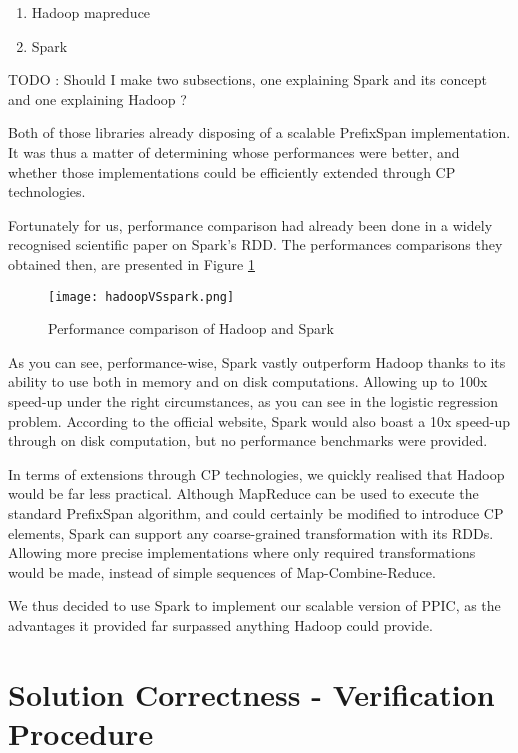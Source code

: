 \documentclass{eplmastersthesis}
\begin{document}
\begin{enumerate}
\item Hadoop mapreduce
\item Spark
\end{enumerate}

TODO : Should I make two subsections, one explaining Spark and its concept and one explaining Hadoop ?

Both of those libraries already disposing of a scalable PrefixSpan implementation. It was thus a matter of determining whose performances were better, and whether those implementations could be efficiently extended through CP technologies. \newline

Fortunately for us, performance comparison had already been done in a widely recognised scientific paper on Spark's RDD\cite{RDD}. The performances comparisons they obtained then, are presented in Figure \ref{fig:hadoopVSspark}

\begin{figure}[h]
  \centering
  \texttt{[image: hadoopVSspark.png]}
  \caption{Performance comparison of Hadoop and Spark}
  \label{fig:hadoopVSspark}
\end{figure}

As you can see, performance-wise, Spark vastly outperform Hadoop thanks to its ability to use both in memory and on disk computations. Allowing up to 100x speed-up under the right circumstances, as you can see in the logistic regression problem. According to the official website, Spark would also boast a 10x speed-up through on disk computation, but no performance benchmarks were provided. \newline

In terms of extensions through CP technologies, we quickly realised that Hadoop would be far less practical. Although MapReduce can be used to execute the standard PrefixSpan algorithm, and could certainly be modified to introduce CP elements, Spark can support any coarse-grained transformation with its RDDs. Allowing more precise implementations where only required transformations would be made, instead of simple sequences of Map-Combine-Reduce. \newline

We thus decided to use Spark to implement our scalable version of PPIC, as the advantages it provided far surpassed anything Hadoop could provide.

\section{Solution Correctness - Verification Procedure}
\end{document}
